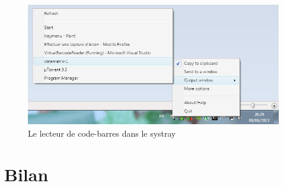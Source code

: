 \begin{figure}
\begin{center}
\includegraphics[scale=0.7]{images/traymenu.png}
\end{center}
\caption{Le lecteur de code-barres dans le systray}
\label{systrayMenu}
\end{figure}


\section{Bilan}